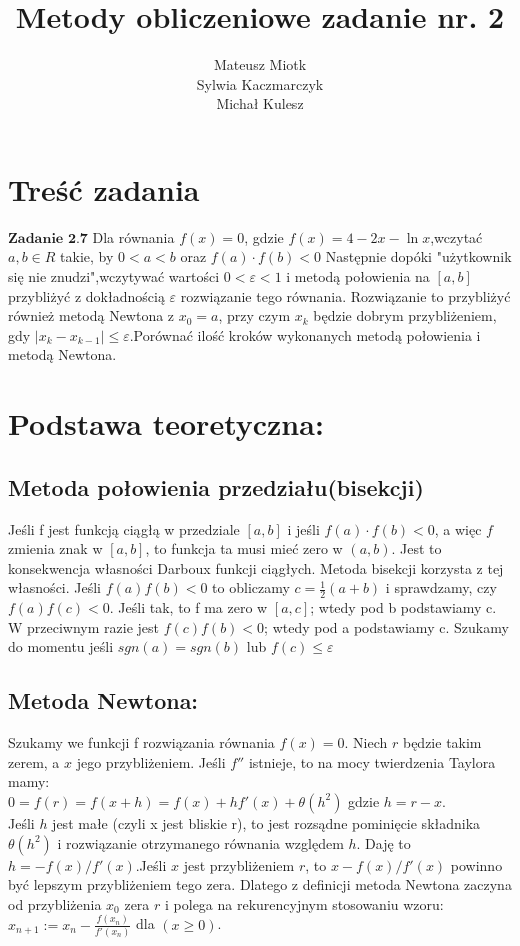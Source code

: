 \documentclass[11pt]{article} %
\title{Metody obliczeniowe zadanie nr. 2}
\author{Mateusz Miotk \\ Sylwia Kaczmarczyk \\ Michał Kulesz}
\date{} %
\begin{document}
\maketitle

\section{Treść zadania}

$\textbf {Zadanie 2.7}$ Dla równania $f(x) = 0$, gdzie $f(x)=4-2x-\ln x$,wczytać $ a,b \in R$ takie, by $0<a<b$ oraz $f(a)\cdot f(b)<0$ Następnie dopóki "użytkownik się nie znudzi",wczytywać wartości $0<\varepsilon<1 $ i metodą połowienia na $[a,b]$ przybliżyć z dokładnością $\varepsilon$ rozwiązanie tego równania. Rozwiązanie to przybliżyć również metodą Newtona z $x_0=a$, przy czym $x_k$ będzie dobrym przybliżeniem, gdy $|x_k-x_{k-1}|\le \varepsilon$.Porównać ilość kroków wykonanych metodą połowienia i metodą Newtona. 

\section {Podstawa teoretyczna:}
\subsection{Metoda połowienia przedziału(bisekcji)}
Jeśli f jest funkcją ciągłą w przedziale $[a,b]$ i jeśli $f(a) \cdot f(b) < 0 $, a więc $f$ zmienia znak w $[a,b]$, to funkcja ta musi mieć zero w $(a,b)$. Jest to konsekwencja własności Darboux funkcji ciągłych. Metoda bisekcji korzysta z tej własności. Jeśli $f(a)f(b) < 0 $ to obliczamy $c=\frac{1}{2}(a+b)$ i sprawdzamy, czy $f(a)f(c) < 0$. Jeśli tak, to f ma zero w $[a,c]$; wtedy pod b podstawiamy c. W przeciwnym razie jest $f(c)f(b) < 0$; wtedy pod a podstawiamy c. Szukamy do momentu jeśli $sgn(a)=sgn(b)$ lub $f(c) \le \varepsilon$ 
\subsection{Metoda Newtona:}
Szukamy we funkcji f rozwiązania równania $f(x)=0$. Niech $r$ będzie takim zerem, a $x$ jego przybliżeniem. Jeśli $f''$ istnieje, to na mocy twierdzenia Taylora mamy: \\
$0=f(r)=f(x+h)=f(x)+hf'(x) + \theta(h^2)$
gdzie $h=r-x$.\\ Jeśli $h$ jest małe (czyli x jest bliskie r), to jest rozsądne pominięcie składnika $\theta(h^2)$ i rozwiązanie otrzymanego równania względem $h$. Daję to $h=-f(x)/f'(x)$.Jeśli $x$ jest przybliżeniem $r$, to $x-f(x)/f'(x)$ powinno być lepszym przybliżeniem tego zera. Dlatego z definicji metoda Newtona zaczyna od przybliżenia $x_0$ zera $r$ i polega na rekurencyjnym stosowaniu wzoru:\\
$x_{n+1}:=x_n - \frac{f(x_n)}{f'(x_n)}$ dla $(x\ge 0)$.
\end{document}
